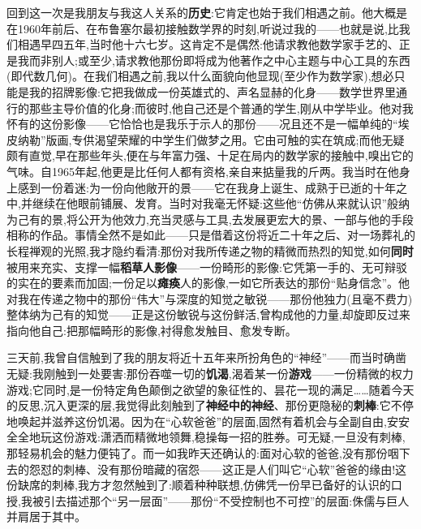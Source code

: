 回到这一次是我朋友与我这人关系的\textbf{历史}:它肯定也始于我们相遇之前。他大概是在1960年前后、在布鲁塞尔最初接触数学界的时刻,听说过我的——也就是说,比我们相遇\dmark{}早四五年,当时他十六七岁。这肯定不是偶然:他请求教他数学家手艺的、正是我而非别人;或至少,请求教他那份即将成为他著作之中心主题与中心工具的东西(即代数几何)。在我们相遇之前,我以什么面貌向他显现(至少作为数学家),想必只能是我的招牌影像:它把我做成一份英雄式的、声名显赫的化身——数学世界里通行的那些主导价值的化身;而彼时,他自己还是个普通的学生,刚从中学毕业。他对我怀有的这份影像——它恰恰也是我乐于示人的那份——况且还不是一幅单纯的“埃皮纳勒”版画,专供渴望荣耀的中学生们做梦之用。它由可触的实在筑成;而他无疑颇有直觉,早在那些年头,便在与年富力强、十足在局内的数学家的接触中,嗅出它的气味。自1965年起,他更是比任何人都有资格,亲自来掂量我的斤两。我当时在他身上感到一份着迷:为一份向他敞开的景——它在我身上诞生、成熟于已逝的十年之中,并继续在他眼前铺展、发育。当时对我毫无怀疑:这些他“仿佛从来就认识”般纳为己有的景,将公开为他效力,充当灵感与工具,去发展更宏大的景、一部与他的手段相称的作品。事情全然不是如此——只是借着这份将近二十年之后、对一场葬礼的长程禅观的光照,我才隐约看清:那份对我所传递之物的精微而热烈的知觉,如何\textbf{同时}被用来充实、支撑一幅\textbf{稻草人影像}——一份畸形的影像:它凭第一手的、无可辩驳的实在的要素而加固;一份足以\textbf{瘫痪}人的影像,一如它所表达的那份“贴身信念”。他对我在传递之物中的那份“伟大”与深度的知觉之敏锐——那份他独力(且毫不费力)整体纳为己有的知觉——正是这份敏锐与这份鲜活,曾构成他的力量,却旋即反过来指向他自己:把那幅畸形的影像,衬得愈发触目、愈发专断。

三天前,我曾自信触到了我的朋友将近十五年来所扮角色的“神经”——而当时确凿无疑:我刚触到一处要害:那份吞噬一切的\textbf{饥渴},渴着某一份\textbf{游戏}——一份精微的权力游戏;它同时,是一份特定角色颠倒之欲望的象征性的、昙花一现的满足……随着今天的反思,沉入更深的层,我觉得此刻触到了\textbf{神经中的神经}、那份更隐秘的\textbf{刺棒}:它不停地唤起并滋养这份饥渴。因为在“心软爸爸”的层面,固然有着机会与全副自由,安安全全地玩这份游戏:潇洒而精微地领舞,稳操每一招的胜券。可无疑,一旦没有刺棒,那轻易机会的魅力便钝了。而一如我昨天还确认的:面对心软的爸爸,没有那份咽下去的怨怼的刺棒、没有那份暗藏的宿怨——这正是人们叫它“心软”爸爸的缘由!这份缺席的刺棒,我方才忽然触到了:顺着种种联想,仿佛凭一份早已备好的认识的口授,我被引去描述那个“另一层面”——那份“不受控制也不可控”的层面:侏儒与巨人并肩居于其中。

